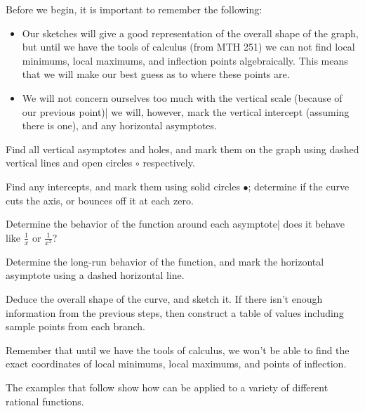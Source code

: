  Before we begin, it is important to remember the following:
 \begin{itemize}
	 \item Our sketches will give a good representation of the overall
	       shape of the graph, but until we have the tools of calculus (from MTH 251)
	       we can not find local minimums, local maximums, and inflection points algebraically. This
	       means that we will make our best guess as to where these points are.
	 \item We will not concern ourselves too much with the vertical scale (because of
	       our previous point)| we will, however, mark the vertical intercept (assuming there is one),
	       and any horizontal asymptotes.
 \end{itemize}
 \begin{pccspecialcomment}\label{rat:def:stepsforsketch}
	 \begin{steps}
		 \item \label{rat:step:first} Find all vertical asymptotes and holes, and mark them on the
		 graph using dashed vertical lines and open circles $\circ$ respectively.
		 \item Find any intercepts, and mark them using solid circles $\bullet$;
		 determine if the curve cuts the axis, or bounces off it at each zero.
		 \item Determine the behavior of the function around each asymptote| does
		 it behave like $\frac{1}{x}$ or $\frac{1}{x^2}$?
		 \item \label{rat:step:penultimate} Determine the long-run behavior of the function, and mark the horizontal
		 asymptote using a dashed horizontal line.
		 \item \label{rat:step:last}  Deduce the overall shape of the curve, and sketch it. If there isn't
		 enough information from the previous steps, then construct a table of values
		 including sample points from each branch.
	 \end{steps}
	 Remember that until we have the tools of calculus, we won't be able to
	 find the exact coordinates of local minimums, local maximums, and points
	 of inflection.
 \end{pccspecialcomment}

 The examples that follow show how  can be
 applied to a variety of different rational functions.

